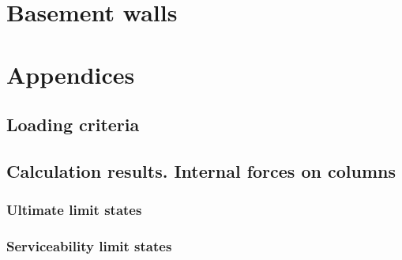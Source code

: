 \section{Basement walls}


\newpage
\appendix
\section*{Appendices}
\renewcommand{\thesubsection}{\Alph{subsection}}

\subsection{Loading criteria} \label{loadCrit}


\newpage
\subsection{Calculation results. Internal forces on columns}\label{sc_column_internal_forces}
\subsubsection{Ultimate limit states}

\clearpage
\newpage
\subsubsection{Serviceability limit states}


